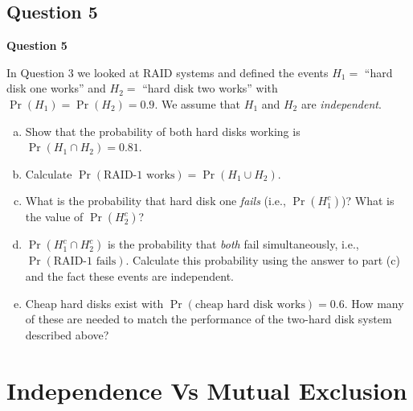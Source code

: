 \documentclass[compress]{beamer}        %
\makeatletter
\newcommand{\tcb}{\textcolor{beamer@blendedblue}}
\makeatother
\begin{document}
\subsection{Question 5}
\begin{frame}{\bf \tcb{Question 5}\\[-0.8cm]}

In Question 3 we looked at RAID systems and defined the events $H_1 = $ ``hard disk one works'' and $H_2 = $ ``hard disk two works'' with $\Pr(H_1) = \Pr(H_2) = 0.9$. We assume that $H_1$ and $H_2$ are \emph{independent}.

\begin{enumerate}[a)]\itemsep0.2cm
\item Show that the probability of both hard disks working is $\Pr(H_1 \cap H_2) = 0.81$.
\item Calculate $\Pr(\text{RAID-1 works}) = \Pr(H_1 \cup H_2)$.
\item What is the probability that hard disk one \emph{fails} (i.e., $\Pr(H_1^c)$)? What is the value of $\Pr(H_2^c)$?
\item $\Pr(H_1^c \cap H_2^c)$ is the probability that \emph{both} fail simultaneously, i.e.,  $\Pr(\text{RAID-1 fails})$. Calculate this probability using the answer to part (c) and the fact these events are independent.
\item Cheap hard disks exist with $\Pr(\text{cheap hard disk works}) = 0.6$. How many of these are needed to match the performance of the two-hard disk system described above?
\end{enumerate}

\end{frame}




\section{Independence Vs Mutual Exclusion}
\end{document}
